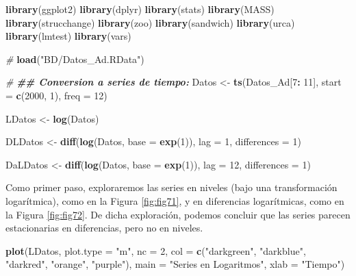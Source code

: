 \documentclass[
]{book}
\newenvironment{Shaded}{\begin{snugshade}}{\end{snugshade}}
\newcommand{\AttributeTok}[1]{\textcolor[rgb]{0.13,0.29,0.53}{#1}}
\newcommand{\CommentTok}[1]{\textcolor[rgb]{0.56,0.35,0.01}{\textit{#1}}}
\newcommand{\DecValTok}[1]{\textcolor[rgb]{0.00,0.00,0.81}{#1}}
\newcommand{\DocumentationTok}[1]{\textcolor[rgb]{0.56,0.35,0.01}{\textbf{\textit{#1}}}}
\newcommand{\FunctionTok}[1]{\textcolor[rgb]{0.13,0.29,0.53}{\textbf{#1}}}
\newcommand{\NormalTok}[1]{#1}
\newcommand{\OtherTok}[1]{\textcolor[rgb]{0.56,0.35,0.01}{#1}}
\newcommand{\SpecialCharTok}[1]{\textcolor[rgb]{0.81,0.36,0.00}{\textbf{#1}}}
\newcommand{\StringTok}[1]{\textcolor[rgb]{0.31,0.60,0.02}{#1}}
\begin{document}
\begin{Shaded}
\begin{Highlighting}[]
\FunctionTok{library}\NormalTok{(ggplot2)}
\FunctionTok{library}\NormalTok{(dplyr)}
\FunctionTok{library}\NormalTok{(stats)}
\FunctionTok{library}\NormalTok{(MASS)}
\FunctionTok{library}\NormalTok{(strucchange)}
\FunctionTok{library}\NormalTok{(zoo)}
\FunctionTok{library}\NormalTok{(sandwich)}
\FunctionTok{library}\NormalTok{(urca)}
\FunctionTok{library}\NormalTok{(lmtest)}
\FunctionTok{library}\NormalTok{(vars)}

\CommentTok{\#}
\FunctionTok{load}\NormalTok{(}\StringTok{"BD/Datos\_Ad.RData"}\NormalTok{)}

\CommentTok{\#}
\DocumentationTok{\#\# Conversion a series de tiempo:}
\NormalTok{Datos }\OtherTok{\textless{}{-}} \FunctionTok{ts}\NormalTok{(Datos\_Ad[}\DecValTok{7}\SpecialCharTok{:} \DecValTok{11}\NormalTok{], }
            \AttributeTok{start =} \FunctionTok{c}\NormalTok{(}\DecValTok{2000}\NormalTok{, }\DecValTok{1}\NormalTok{), }
            \AttributeTok{freq =} \DecValTok{12}\NormalTok{)}

\NormalTok{LDatos }\OtherTok{\textless{}{-}} \FunctionTok{log}\NormalTok{(Datos)}

\NormalTok{DLDatos }\OtherTok{\textless{}{-}} \FunctionTok{diff}\NormalTok{(}\FunctionTok{log}\NormalTok{(Datos, }\AttributeTok{base =} \FunctionTok{exp}\NormalTok{(}\DecValTok{1}\NormalTok{)), }
                \AttributeTok{lag =} \DecValTok{1}\NormalTok{, }
                \AttributeTok{differences =} \DecValTok{1}\NormalTok{)}

\NormalTok{DaLDatos }\OtherTok{\textless{}{-}} \FunctionTok{diff}\NormalTok{(}\FunctionTok{log}\NormalTok{(Datos, }\AttributeTok{base =} \FunctionTok{exp}\NormalTok{(}\DecValTok{1}\NormalTok{)), }
                 \AttributeTok{lag =} \DecValTok{12}\NormalTok{, }
                 \AttributeTok{differences =} \DecValTok{1}\NormalTok{)}
\end{Highlighting}
\end{Shaded}

Como primer paso, exploraremos las series en niveles (bajo una transformación logarítmica), como en la Figura \ref{fig:fig71}, y en diferencias logarítmicas, como en la Figura \ref{fig:fig72}. De dicha exploración, podemos concluir que las series parecen estacionarias en diferencias, pero no en niveles.

\begin{Shaded}
\begin{Highlighting}[]
\FunctionTok{plot}\NormalTok{(LDatos, }
     \AttributeTok{plot.type =} \StringTok{"m"}\NormalTok{, }\AttributeTok{nc =} \DecValTok{2}\NormalTok{,}
     \AttributeTok{col =} \FunctionTok{c}\NormalTok{(}\StringTok{"darkgreen"}\NormalTok{, }\StringTok{"darkblue"}\NormalTok{, }\StringTok{"darkred"}\NormalTok{, }\StringTok{"orange"}\NormalTok{, }\StringTok{"purple"}\NormalTok{), }
     \AttributeTok{main =} \StringTok{"Series en Logaritmos"}\NormalTok{, }
     \AttributeTok{xlab =} \StringTok{"Tiempo"}\NormalTok{)}
\end{Highlighting}
\end{Shaded}
\end{document}
